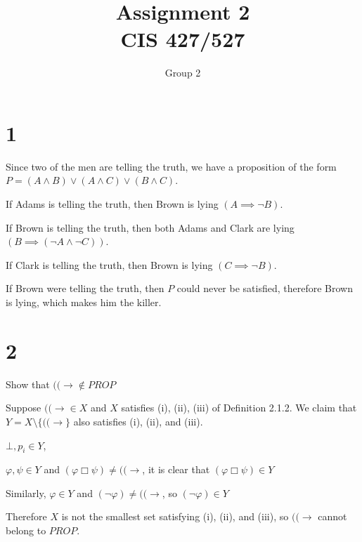 \documentclass[10pt]{article}
\begin{document}
\title{Assignment \raisebox{.22ex}{\large\#}2 \\
	CIS 427/527}
\author{Group 2}

\maketitle


\section*{1}
Since two of the men are telling the truth, we have a proposition of the form $P = (A \land B) \lor (A \land C) \lor (B \land C)$. 
\begin{itemize*}
\item If Adams is telling the truth, then Brown is lying $(A\implies \lnot B)$.
\item If Brown is telling the truth, then both Adams and Clark are lying $(B\implies (\lnot A \land \lnot C))$.
\item If Clark is telling the truth, then Brown is lying $(C\implies \lnot B)$.
\end{itemize*}

\noindent If Brown were telling the truth, then $P$ could never be satisfied, therefore Brown is lying, which makes him the killer.


\section*{2}
\begin{description*}
	\item[2.] Show that $(( \to \notin PROP$
\end{description*}

\noindent Suppose $(( \to \in X$ and $X$ satisfies (i), (ii), (iii) of Definition 2.1.2. We claim that $Y = X\text{\textbackslash} \{ ((\to \}$ also satisfies (i), (ii), and (iii). 
\begin{description*}
\item[\hspace{2em}(i)] $\bot, p_i \in Y$, 
\item[\hspace{2em}(ii)] $\varphi , \psi \in Y$ and $(\varphi \Box \psi) \neq ((\to $, it is clear that $(\varphi \Box \psi) \in Y $
\item[\hspace{2em}(iii)] Similarly, $\varphi \in Y$ and $(\lnot \varphi ) \neq ((\to $, so $(\lnot \varphi ) \in Y $
\end{description*}
Therefore $X$ is not the smallest set satisfying (i), (ii), and (iii), so $((\to $ cannot belong to $PROP$.
\end{document}
